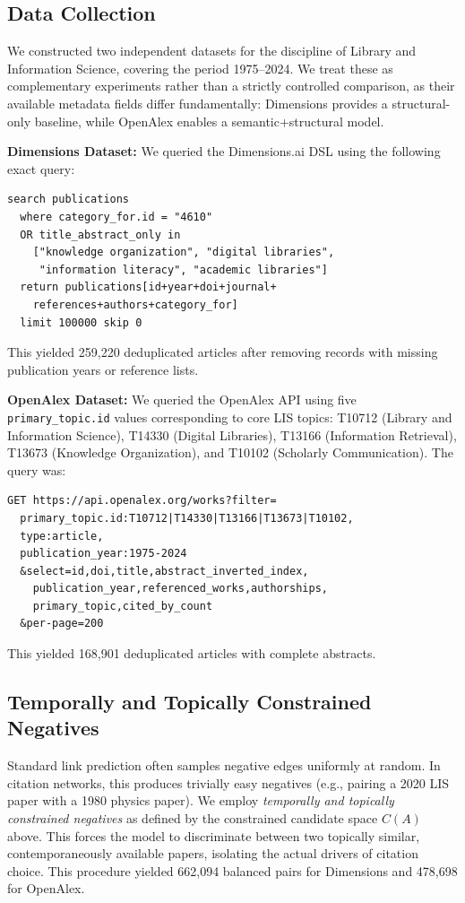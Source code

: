 \documentclass[11pt,a4paper]{article}
\begin{document}
\subsection{Data Collection}
We constructed two independent datasets for the discipline of Library and Information Science, covering the period 1975--2024. We treat these as complementary experiments rather than a strictly controlled comparison, as their available metadata fields differ fundamentally: Dimensions provides a structural-only baseline, while OpenAlex enables a semantic+structural model.

\textbf{Dimensions Dataset:} We queried the Dimensions.ai DSL using the following exact query:
\begin{verbatim}
search publications
  where category_for.id = "4610"
  OR title_abstract_only in
    ["knowledge organization", "digital libraries",
     "information literacy", "academic libraries"]
  return publications[id+year+doi+journal+
    references+authors+category_for]
  limit 100000 skip 0
\end{verbatim}
This yielded 259,220 deduplicated articles after removing records with missing publication years or reference lists.

\textbf{OpenAlex Dataset:} We queried the OpenAlex API using five \texttt{primary\_topic.id} values corresponding to core LIS topics: T10712 (Library and Information Science), T14330 (Digital Libraries), T13166 (Information Retrieval), T13673 (Knowledge Organization), and T10102 (Scholarly Communication). The query was:
\begin{verbatim}
GET https://api.openalex.org/works?filter=
  primary_topic.id:T10712|T14330|T13166|T13673|T10102,
  type:article,
  publication_year:1975-2024
  &select=id,doi,title,abstract_inverted_index,
    publication_year,referenced_works,authorships,
    primary_topic,cited_by_count
  &per-page=200
\end{verbatim}
This yielded 168,901 deduplicated articles with complete abstracts.

\subsection{Temporally and Topically Constrained Negatives}
Standard link prediction often samples negative edges uniformly at random. In citation networks, this produces trivially easy negatives (e.g., pairing a 2020 LIS paper with a 1980 physics paper). We employ \textit{temporally and topically constrained negatives} as defined by the constrained candidate space $C(A)$ above. This forces the model to discriminate between two topically similar, contemporaneously available papers, isolating the actual drivers of citation choice. This procedure yielded 662,094 balanced pairs for Dimensions and 478,698 for OpenAlex.
\end{document}
